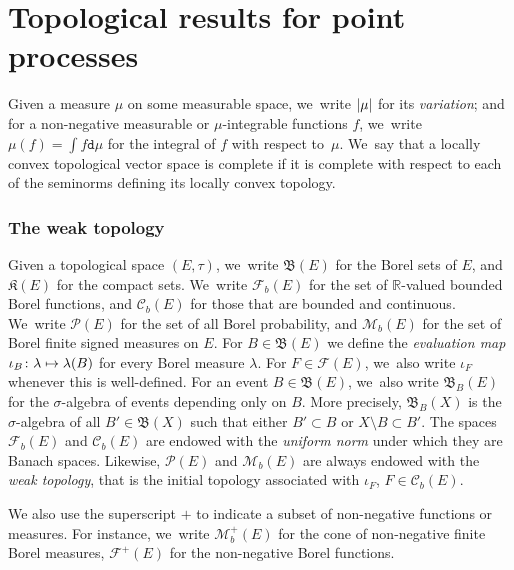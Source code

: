 \documentclass[10pt]{amsart}
\newcommand\mto{\mathchoice{\longmapsto}{\mapsto}{\mapsto}{\mapsto}}
\newcommand{\real}{\mathbb{R}}
\theoremstyle{definition}
\theoremstyle{remark}
\DeclarePairedDelimiter{\abs}{\lvert}{\rvert}
\begin{document}
\section{Topological results for point processes}\label{s:reminders}

Given a measure $\mu$ on some measurable space, we~write $\abs{\mu}$ for its \emph{variation}; and for a non-negative measurable or $\mu$-integrable functions $f$, we~write $\mu(f) = \int f \mathtt{d} \mu$ for the integral of $f$ with respect to~$\mu$. We~say that a locally convex topological vector space is complete if it is complete with respect to each of the seminorms defining its locally convex topology.\vspace*{-5pt}

\subsubsection{The weak topology}
Given a topological space $(E,\tau)$, we~write $\mathfrak{B}(E)$ for the Borel sets of $E$, and $\mathfrak{K}(E)$ for the compact sets. We~write $\mathscr{F}_{b}(E)$ for the set of $\real$-valued bounded Borel functions, and $\mathscr{C}_{b}(E)$ for those that are bounded and continuous. We~write $\mathscr{P}(E)$ for the set of all Borel probability, and $\mathscr{M}_{b}(E)$ for the set of Borel finite signed measures on $E$.
For $B \in \mathfrak{B}(E)$ we define the \emph{evaluation map} $\iota_{B}\colon \lambda \mto \lambda(B)$ for every Borel measure $\lambda$.
For $F \in \mathscr{F}(E)$, we~also write $\iota_{F}$ whenever this is well-defined.
For an event $B \in \mathfrak{B}(E)$, we~also write $\mathfrak{B}_{B}(E)$ for the $\sigma$-algebra of events depending only on $B$.
More precisely, $\mathfrak{B}_{B}(X)$ is the $\sigma$-algebra of all $B' \in \mathfrak{B}(X)$ such that either $B' \subset B$ or $X \setminus B \subset B'$.
The spaces $\mathscr{F}_{b}(E)$ and $\mathscr{C}_{b}(E)$ are endowed with the \emph{uniform norm} under which they are Banach spaces.
Likewise, $\mathscr{P}(E)$ and $\mathscr{M}_{b}(E)$ are always endowed with the \emph{weak topology}, that is the initial topology associated with $\iota_{F}$, $F \in \mathscr{C}_{b}(E)$.

We also use the superscript $+$ to indicate a subset of non-negative functions or measures.
For instance, we~write $\mathscr{M}_{b}^{+}(E)$ for the cone of non-negative finite Borel measures, $\mathscr{F}^{+}(E)$ for the non-negative Borel functions.\vspace*{-5pt}\enlargethispage{.7\baselineskip}%
\end{document}
